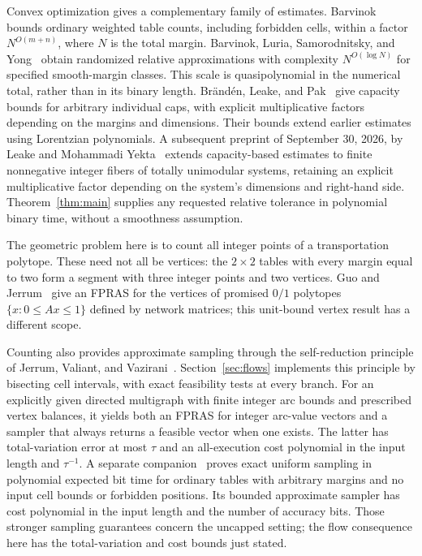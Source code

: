 Convex optimization gives a complementary family of estimates.
Barvinok~\cite[Theorem~1.3]{Barvinok2009} bounds ordinary weighted
table counts, including forbidden cells, within a factor
$N^{O(m+n)}$, where $N$ is the total margin. Barvinok, Luria,
Samorodnitsky, and Yong~\cite{BLSY2010} obtain randomized relative
approximations with complexity $N^{O(\log N)}$ for specified
smooth-margin classes. This scale is quasipolynomial in the numerical
total, rather than in its binary length. Br\"and\'en, Leake, and
Pak~\cite[Theorem~2.1]{BLP2021} give capacity bounds for arbitrary
individual caps, with explicit multiplicative factors depending on
the margins and dimensions. Their bounds extend earlier estimates
using Lorentzian polynomials. A subsequent preprint of September 30,
2026, by Leake and Mohammadi Yekta~\cite[Theorems~1.1 and~1.3]{LMY2026}
extends capacity-based estimates to finite nonnegative integer fibers
of totally unimodular systems, retaining an explicit multiplicative
factor depending on the system's dimensions and right-hand side.
Theorem~\ref{thm:main} supplies
any requested relative tolerance in polynomial binary time, without
a smoothness assumption.

The geometric problem here is to count all integer points of a
transportation polytope. These need not all be vertices: the
$2\times2$ tables with every margin equal to two form a segment
with three integer points and two vertices. Guo and
Jerrum~\cite[Proposition~4.2]{GJ2023} give an FPRAS for the vertices
of promised $0/1$ polytopes $\{x:0\le Ax\le1\}$ defined by network
matrices; this unit-bound vertex result has a different scope.

Counting also provides approximate sampling through the
self-reduction principle of Jerrum, Valiant, and
Vazirani~\cite[Theorem~6.3]{JVV1986}. Section~\ref{sec:flows}
implements this principle by bisecting cell intervals, with exact
feasibility tests at every branch. For an explicitly given directed
multigraph with finite integer arc bounds and prescribed vertex
balances, it yields both an FPRAS for integer arc-value vectors and
a sampler that always returns a feasible vector when one exists.
The latter has total-variation error at most $\tau$ and an
all-execution cost polynomial in the input length and $\tau^{-1}$.
A separate companion~\cite[Theorem~1.1]{OpenAIExactTables2026}
proves exact uniform sampling in polynomial expected bit time for
ordinary tables with arbitrary margins and no input cell bounds or
forbidden positions. Its bounded approximate sampler has cost
polynomial in the input length and the number of accuracy bits. Those stronger sampling
guarantees concern the uncapped setting; the flow consequence here
has the total-variation and cost bounds just stated.
